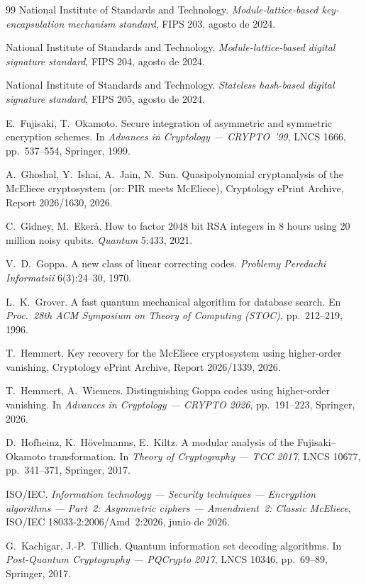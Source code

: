 \begin{thebibliography}{99}
National Institute of Standards and Technology. \emph{Module-lattice-based
key-encapsulation mechanism standard}, FIPS 203, agosto de 2024.

National Institute of Standards and Technology. \emph{Module-lattice-based
digital signature standard}, FIPS 204, agosto de 2024.

National Institute of Standards and Technology. \emph{Stateless
hash-based digital signature standard}, FIPS 205, agosto de 2024.

E.~Fujisaki, T.~Okamoto. Secure integration of asymmetric and
symmetric encryption schemes. In \emph{Advances in Cryptology ---
CRYPTO~'99}, LNCS 1666, pp.~537--554, Springer, 1999.

A.~Ghoshal, Y.~Ishai, A.~Jain, N.~Sun. Quasipolynomial cryptanalysis
of the McEliece cryptosystem (or: PIR meets McEliece), Cryptology
ePrint Archive, Report 2026/1630, 2026.

C.~Gidney, M.~Eker\r{a}. How to factor 2048 bit RSA integers in
8 hours using 20 million noisy qubits. \emph{Quantum} 5:433, 2021.

V.~D.~Goppa. A new class of linear correcting codes.
\emph{Problemy Peredachi Informatsii} 6(3):24--30, 1970.

L.~K.~Grover. A fast quantum mechanical algorithm for database
search. En \emph{Proc.\ 28th ACM Symposium on Theory of Computing
(STOC)}, pp.~212--219, 1996.

T.~Hemmert. Key recovery for the McEliece cryptosystem using
higher-order vanishing, Cryptology ePrint Archive, Report 2026/1339,
2026.

T.~Hemmert, A.~Wiemers. Distinguishing Goppa codes using
higher-order vanishing. In \emph{Advances in Cryptology ---
CRYPTO 2026}, pp.~191--223, Springer, 2026.

D.~Hofheinz, K.~H\"ovelmanns, E.~Kiltz. A modular analysis of the
Fujisaki--Okamoto transformation. In \emph{Theory of Cryptography ---
TCC 2017}, LNCS 10677, pp.~341--371, Springer, 2017.

ISO/IEC. \emph{Information technology --- Security techniques ---
Encryption algorithms --- Part~2: Asymmetric ciphers ---
Amendment~2: Classic McEliece}, ISO/IEC 18033-2:2006/Amd~2:2026,
junio de 2026.

G.~Kachigar, J.-P.~Tillich. Quantum information set decoding
algorithms. In \emph{Post-Quantum Cryptography --- PQCrypto 2017},
LNCS 10346, pp.~69--89, Springer, 2017.


\end{thebibliography}
